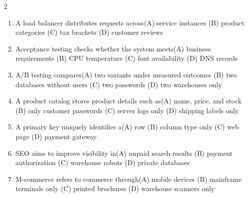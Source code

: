 \documentclass[a4paper]{article}
\begin{document}
\begin{multicols*}{2}
\begin{enumerate}
\item A load balancer distributes requests across\newline\hspace*{0.6em}(A) service instances \quad (B) product categories \newline\hspace*{0.6em}(C) tax brackets \quad (D) customer reviews
\item Acceptance testing checks whether the system meets\newline\hspace*{0.6em}(A) business requirements \quad (B) CPU temperature \newline\hspace*{0.6em}(C) font availability \quad (D) DNS records
\item A/B testing compares\newline\hspace*{0.6em}(A) two variants under measured outcomes \quad (B) two databases without users \newline\hspace*{0.6em}(C) two passwords \quad (D) two warehouses only
\item A product catalog stores product details such as\newline\hspace*{0.6em}(A) name, price, and stock \quad (B) only customer passwords \newline\hspace*{0.6em}(C) server logs only \quad (D) shipping labels only
\item A primary key uniquely identifies a\newline\hspace*{0.6em}(A) row \quad (B) column type only \newline\hspace*{0.6em}(C) web page \quad (D) payment gateway
\item SEO aims to improve visibility in\newline\hspace*{0.6em}(A) unpaid search results \quad (B) payment authorization \newline\hspace*{0.6em}(C) warehouse robots \quad (D) private databases
\item M-commerce refers to commerce through\newline\hspace*{0.6em}(A) mobile devices \quad (B) mainframe terminals only \newline\hspace*{0.6em}(C) printed brochures \quad (D) warehouse scanners only

\end{enumerate}
\end{multicols*}
\end{document}
